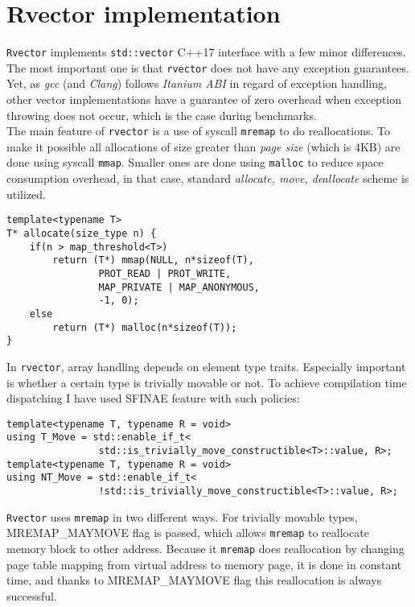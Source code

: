 \documentclass[inz, english, shortabstract]{iithesis}
\begin{document}
\chapter{Rvector implementation}
{\tt Rvector}\cite{rvector_impl} implements {\tt std::vector} C++17 interface with a few minor differences. The most important one is that {\tt rvector} does not have any exception guarantees. Yet, as \emph{gcc} (and \emph{Clang}) follows \emph{Itanium ABI}\cite{Itanium_ABI} in regard of exception handling, other vector implementations have a guarantee of zero overhead when exception throwing does not occur, which is the case during benchmarks. \\
The main feature of {\tt rvector} is a use of syscall {\tt mremap} to do reallocations. To make it possible all allocations of size greater than \emph{page size} (which is 4KB) are done using syscall {\tt mmap}. Smaller ones are done using {\tt malloc} to reduce space consumption overhead, in that case, standard \emph{allocate, move, deallocate} scheme is utilized.

\begin{lstlisting}[caption=rvector allocation]
template<typename T>
T* allocate(size_type n) {
	if(n > map_threshold<T>)
    	return (T*) mmap(NULL, n*sizeof(T), 
                PROT_READ | PROT_WRITE,
                MAP_PRIVATE | MAP_ANONYMOUS,
                -1, 0);
    else
    	return (T*) malloc(n*sizeof(T));
}
\end{lstlisting}
In {\tt rvector}, array handling depends on element type traits. Especially important is whether a certain type is trivially movable or not. To achieve compilation time dispatching I have used SFINAE feature with such policies:

\begin{lstlisting}[caption=SFINAE policies]
template<typename T, typename R = void>
using T_Move = std::enable_if_t<
				std::is_trivially_move_constructible<T>::value, R>;
template<typename T, typename R = void>
using NT_Move = std::enable_if_t<
				!std::is_trivially_move_constructible<T>::value, R>;
\end{lstlisting}
{\tt Rvector} uses {\tt mremap} in two different ways. For trivially movable types, MREMAP\_MAYMOVE flag is passed, which allows {\tt mremap} to reallocate memory block to other address. Because it {\tt mremap} does reallocation by changing page table mapping from virtual address to memory page\cite{mremap}, it is done in constant time, and thanks to MREMAP\_MAYMOVE flag this reallocation is always successful. 
\end{document}
